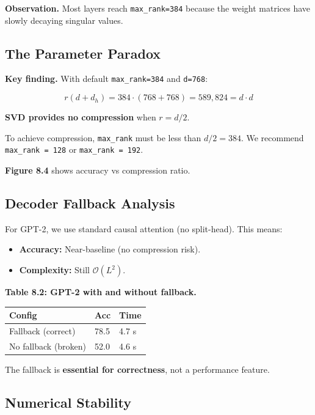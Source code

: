 \textbf{Observation.} Most layers reach \texttt{max\_rank=384} because the weight 
matrices have slowly decaying singular values.

\subsection{The Parameter Paradox}

\textbf{Key finding.} With default \texttt{max\_rank=384} and \texttt{d=768}:

\begin{equation}
r(d + d_h) = 384 \cdot (768 + 768) = 589,824 = d \cdot d
\end{equation}

\textbf{SVD provides no compression} when $r = d/2$.

To achieve compression, \texttt{max\_rank} must be less than $d/2 = 384$. We 
recommend \texttt{max\_rank = 128} or \texttt{max\_rank = 192}.

\textbf{Figure 8.4} shows accuracy vs compression ratio.

\subsection{Decoder Fallback Analysis}

For GPT-2, we use standard causal attention (no split-head). This means:

\begin{itemize}
\item \textbf{Accuracy:} Near-baseline (no compression risk).
\item \textbf{Complexity:} Still $\mathcal{O}(L^2)$.

\end{itemize}
\textbf{Table 8.2: GPT-2 with and without fallback.}

\begin{table}[H]
\centering
\small
\begin{tabular}{lll}
\toprule
\textbf{Config} & \textbf{Acc} & \textbf{Time} \\
\midrule
Fallback (correct) & 78.5 & 4.7 s \\
No fallback (broken) & 52.0 & 4.6 s \\
\bottomrule
\end{tabular}
\end{table}

The fallback is \textbf{essential for correctness}, not a performance feature.

\subsection{Numerical Stability}

